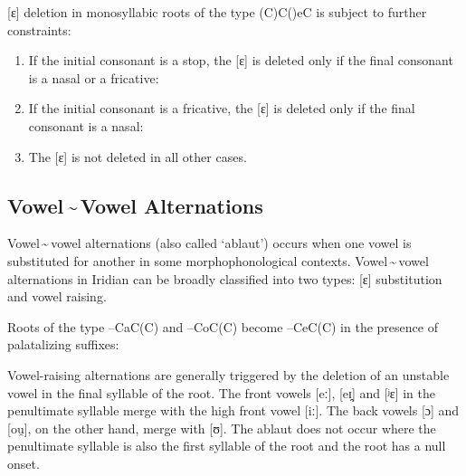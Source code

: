 [ɛ] deletion in monosyllabic roots of the type (C)C()eC is subject to
further constraints:

\begin{enumerate}
	\item If the initial consonant is a stop, the [ɛ] is deleted only if the final consonant is a nasal or a fricative:\\

	\item If the initial consonant is a fricative, the [ɛ] is deleted only if the final consonant is a nasal:\\

	\item The [ɛ] is not deleted in all other cases.
\end{enumerate}

\subsection{Vowel\,\sim\,Vowel Alternations}
Vowel\,\sim\,vowel alternations (also called `ablaut') occurs when one vowel is
substituted for another in some morphophonological contexts. Vowel\,\sim\,vowel
alternations in Iridian can be broadly classified into two types: [ɛ]
substitution and vowel raising.

Roots of the type --CaC(C) and --CoC(C) become --CeC(C) in the
presence of palatalizing suffixes:

\ex
{}
\xe

Vowel-raising alternations are generally triggered by the deletion of an
unstable vowel in the final syllable of the root. The front vowels [eː], [eɪ̯]
and [ʲɛ] in the penultimate syllable merge with the high front vowel [iː]. The
back vowels [ɔ] and [ou̯], on the other hand, merge with [ʊ]. The ablaut does
not occur where the penultimate syllable is also the first syllable of the root
and the root has a null onset.

